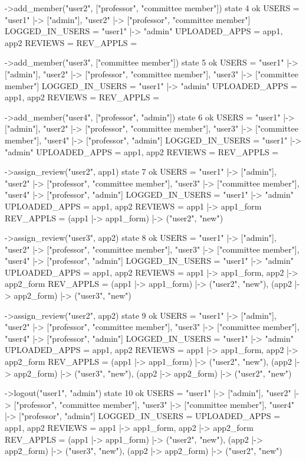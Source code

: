 \documentclass[fontsize=12pt,paper=letter,twoside]{scrartcl}
\begin{document}
\newpage
\begin{code}  
->add_member("user2", ["professor", "committee member"])
  state 4 ok
  USERS = {"user1" |-> ["admin"], "user2" |-> 
  ["professor", "committee member"]}
  LOGGED_IN_USERS = {"user1" |-> "admin"}
  UPLOADED_APPS = {app1, app2}
  REVIEWS = {}
  REV_APPLS = {}
  
->add_member("user3", ["committee member"])
  state 5 ok
  USERS = {"user1" |-> ["admin"], "user2" |-> 
  ["professor", "committee member"], "user3" |-> 
  ["committee member"]}
  LOGGED_IN_USERS = {"user1" |-> "admin"}
  UPLOADED_APPS = {app1, app2}
  REVIEWS = {}
  REV_APPLS = {}
  
->add_member("user4", ["professor", "admin"])
  state 6 ok
  USERS = {"user1" |-> ["admin"], "user2" |-> 
  ["professor", "committee member"], "user3" |-> 
  ["committee member"], "user4" |-> ["professor", "admin"]}
  LOGGED_IN_USERS = {"user1" |-> "admin"}
  UPLOADED_APPS = {app1, app2}
  REVIEWS = {}
  REV_APPLS = {}
 
->assign_review("user2", app1)
  state 7 ok
  USERS = {"user1" |-> ["admin"], "user2" |-> 
  ["professor", "committee member"], "user3" |-> 
  ["committee member"], "user4" |-> ["professor", "admin"]}
  LOGGED_IN_USERS = {"user1" |-> "admin"}
  UPLOADED_APPS = {app1, app2}
  REVIEWS = {app1 |-> app1_form}
  REV_APPLS = {(app1 |-> app1_form) |-> ("user2", "new")}
\end{code}

\newpage
\begin{code}
->assign_review("user3", app2)
  state 8 ok
  USERS = {"user1" |-> ["admin"], "user2" |-> 
  ["professor", "committee member"], "user3" |-> 
  ["committee member"], "user4" |-> ["professor", "admin"]}
  LOGGED_IN_USERS = {"user1" |-> "admin"}
  UPLOADED_APPS = {app1, app2}
  REVIEWS = {app1 |-> app1_form, app2 |-> app2_form}
  REV_APPLS = {(app1 |-> app1_form) |-> ("user2", "new"),
  (app2 |-> app2_form) |-> ("user3", "new")}

->assign_review("user2", app2)
  state 9 ok
  USERS = {"user1" |-> ["admin"], "user2" |-> 
  ["professor", "committee member"], "user3" |-> 
  ["committee member"], "user4" |-> ["professor", "admin"]}
  LOGGED_IN_USERS = {"user1" |-> "admin"}
  UPLOADED_APPS = {app1, app2}
  REVIEWS = {app1 |-> app1_form, app2 |-> app2_form}
  REV_APPLS = {(app1 |-> app1_form) |-> ("user2", "new"),
  (app2 |-> app2_form) |-> ("user3", "new"), 
  (app2 |-> app2_form) |-> ("user2", "new")}

->logout("user1", "admin")
  state 10 ok
  USERS = {"user1" |-> ["admin"], "user2" |-> ["professor", 
  "committee member"], "user3" |-> ["committee member"], 
  "user4" |-> ["professor", "admin"]}
  LOGGED_IN_USERS = {}
  UPLOADED_APPS = {app1, app2}
  REVIEWS = {app1 |-> app1_form, app2 |-> app2_form}
  REV_APPLS = {(app1 |-> app1_form) |-> ("user2", "new"),
  (app2 |-> app2_form) |-> ("user3", "new"), 
  (app2 |-> app2_form) |-> ("user2", "new")}
\end{code}
\end{document}
